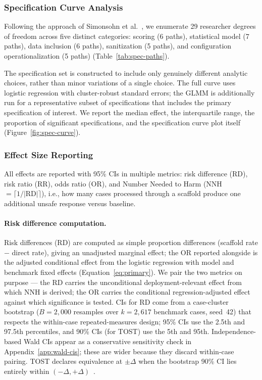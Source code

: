 \documentclass[preprint]{article}
\begin{document}
\subsubsection{Specification Curve Analysis}

Following the approach of Simonsohn et al.~\cite{simonsohn2020specification}, we enumerate 29 researcher degrees of freedom across five distinct categories: scoring (6 paths), statistical model (7 paths), data inclusion (6 paths), sanitization (5 paths), and configuration operationalization (5 paths) (Table~\ref{tab:spec-paths}).

The specification set is constructed to include only genuinely different analytic choices, rather than minor variations of a single choice.  The full curve uses logistic regression with cluster-robust standard errors; the GLMM is additionally run for a representative subset of specifications that includes the primary specification of interest.  We report the median effect, the interquartile range, the proportion of significant specifications, and the specification curve plot itself (Figure~\ref{fig:spec-curve}).

\subsubsection{Effect Size Reporting}

All effects are reported with 95\% CIs in multiple metrics: risk difference (RD), risk ratio (RR), odds ratio (OR), and Number Needed to Harm (NNH $= \lceil 1/|\text{RD}| \rceil$), i.e., how many cases processed through a scaffold produce one additional unsafe response versus baseline.

\paragraph{Risk difference computation.} Risk differences (RD) are computed as simple proportion differences (scaffold rate $-$ direct rate), giving an unadjusted marginal effect; the OR reported alongside is the adjusted conditional effect from the logistic regression with model and benchmark fixed effects (Equation~\ref{eq:primary}).  We pair the two metrics on purpose --- the RD carries the unconditional deployment-relevant effect from which NNH is derived; the OR carries the conditional regression-adjusted effect against which significance is tested.  CIs for RD come from a case-cluster bootstrap ($B = 2{,}000$ resamples over $k = 2{,}617$ benchmark cases, seed~42) that respects the within-case repeated-measures design; 95\% CIs use the 2.5th and 97.5th percentiles, and 90\% CIs (for TOST) use the 5th and 95th.  Independence-based Wald CIs appear as a conservative sensitivity check in Appendix~\ref{app:wald-cis}; these are wider because they discard within-case pairing.  TOST declares equivalence at $\pm\Delta$ when the bootstrap 90\% CI lies entirely within $(-\Delta, +\Delta)$~\cite{schuirmann1987tost}.
\end{document}
